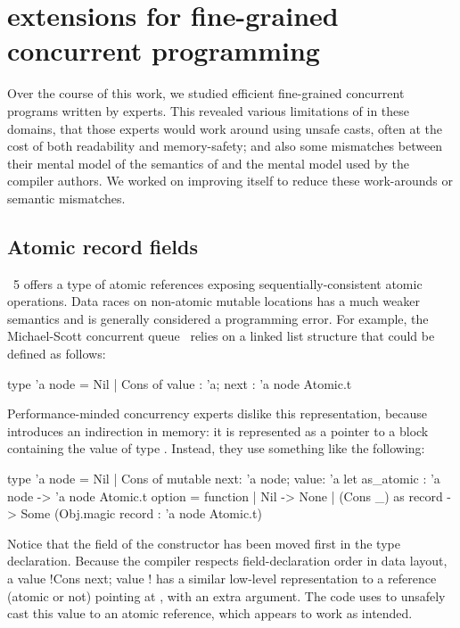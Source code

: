 \section{\OCaml extensions for fine-grained concurrent programming}
\label{sec:ocaml}

Over the course of this work, we studied efficient fine-grained concurrent \OCaml programs written by experts.
This revealed various limitations of \OCaml in these domains, that those experts would work around using unsafe casts, often at the cost of both readability and memory-safety; and also some mismatches between their mental model of the semantics of \OCaml and the mental model used by the \OCaml compiler authors.
We worked on improving \OCaml itself to reduce these work-arounds or semantic mismatches.

\subsection{Atomic record fields}
\label{sec:atomic-record-fields}

\OCaml~5 offers a type  of atomic references exposing sequentially-consistent atomic operations.
Data races on non-atomic mutable locations has a much weaker semantics and is generally considered a programming error.
For example, the Michael-Scott concurrent queue~\cite{DBLP:conf/podc/MichaelS96} relies on a linked list structure that could be defined as follows:

\begin{ocamlcode}
type 'a node = Nil | Cons of { value : 'a; next : 'a node Atomic.t }
\end{ocamlcode}

Performance-minded concurrency experts dislike this representation, because  introduces an indirection in memory: it is represented as a pointer to a block containing the value of type .
Instead, they use something like the following:

\begin{ocamlcode}
type 'a node = Nil | Cons of { mutable next: 'a node; value: 'a }
let as_atomic : 'a node -> 'a node Atomic.t option = function
  | Nil -> None
  | (Cons _) as record -> Some (Obj.magic record : 'a node Atomic.t)
\end{ocamlcode}

Notice that the  field of the  constructor has been moved first in the type declaration.
Because the \OCaml compiler respects field-declaration order in data layout, a value \ocamlinline!Cons { next; value }! has a similar low-level representation to a reference (atomic or not) pointing at , with an extra argument.
The code uses  to unsafely cast this value to an atomic reference, which appears to work as intended.

